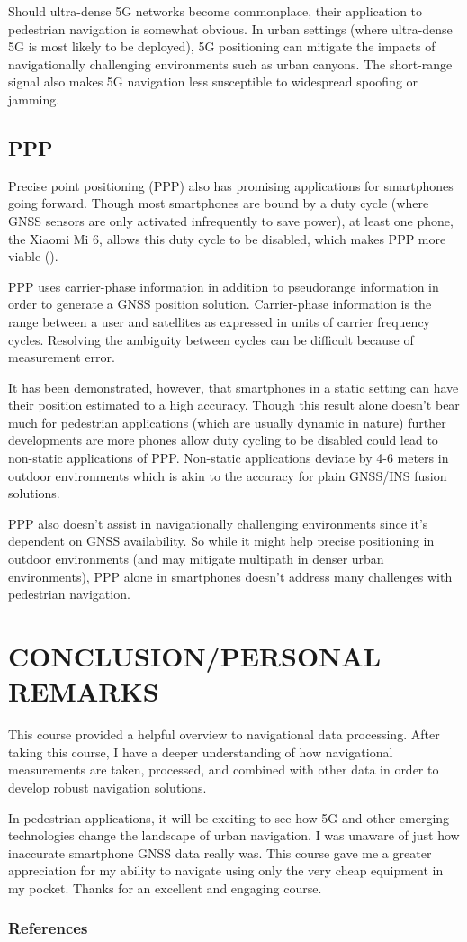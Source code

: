 \documentclass[twoside]{article}
\begin{document}
Should ultra-dense 5G networks become commonplace, their application to pedestrian navigation is somewhat
obvious. In urban settings (where ultra-dense 5G is most likely to be deployed), 5G positioning can mitigate
the impacts of navigationally challenging environments such as urban canyons. The short-range signal also
makes 5G navigation less susceptible to widespread spoofing or jamming.
\subsection{PPP}
Precise point positioning (PPP) also has promising applications for smartphones going forward. Though
most smartphones are bound by a duty cycle (where GNSS sensors are only activated infrequently to
save power), at least one phone, the Xiaomi Mi 6, allows this duty cycle to be disabled, which makes
PPP more viable (\cite{PPP}).

PPP uses carrier-phase information in addition to pseudorange information in order to generate a GNSS
position solution. Carrier-phase information is the range between a user and satellites as expressed
in units of carrier frequency cycles. Resolving the ambiguity between cycles can be difficult because
of measurement error.

It has been demonstrated, however, that smartphones in a static setting can have their position estimated
to a high accuracy. Though this result alone doesn't bear much for pedestrian applications (which are
usually dynamic in nature) further developments are more phones allow duty cycling to be disabled could
lead to non-static applications of PPP. Non-static applications deviate by 4-6 meters in outdoor environments
which is akin to the accuracy for plain GNSS/INS fusion solutions.

PPP also doesn't assist in navigationally challenging environments since it's dependent on GNSS availability.
So while it might help precise positioning in outdoor environments (and may mitigate multipath in denser
urban environments), PPP alone in smartphones doesn't address many challenges with pedestrian navigation.
\section{CONCLUSION/PERSONAL REMARKS}
This course provided a helpful overview to navigational data processing. After taking this course, I have
a deeper understanding of how navigational measurements are taken, processed, and combined with other data
in order to develop robust navigation solutions.

In pedestrian applications, it will be exciting to see how 5G and other emerging technologies change the
landscape of urban navigation. I was unaware of just how inaccurate smartphone GNSS data really was. This
course gave me a greater appreciation for my ability to navigate using only the very cheap equipment in
my pocket. Thanks for an excellent and engaging course.
\subsubsection*{References}
\printbibliography[heading=none]
\end{document}
